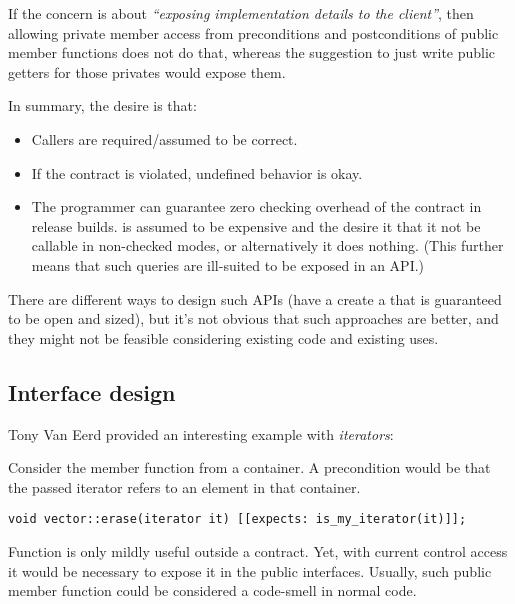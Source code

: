 If the concern is about \emph{``exposing implementation details to the client''}, then
allowing private member access from preconditions and postconditions
of public member functions does not do that, whereas the suggestion to just
write public getters for those privates would expose them.

In summary, the desire is that:

\begin{itemize}

\item Callers are required/assumed to be correct.

\item If the contract is violated, undefined behavior is okay.

\item The programmer can guarantee zero checking overhead of the contract in
release builds.  is assumed to be expensive and the
desire it that it not be callable in non-checked modes, or alternatively it
does nothing. (This further means that such queries are ill-suited to be
exposed in an API.) 

\end{itemize}

There are different ways to design such APIs (have a  create a
 that is guaranteed to be open and sized), but it’s not
obvious that such approaches are better, and they might not be feasible
considering existing code and existing uses.

\subsection{Interface design}

Tony Van Eerd provided an interesting example with \emph{iterators}:

Consider the  member function from a container. A precondition
would be that the passed iterator refers to an element in that container.

\begin{lstlisting}
void vector::erase(iterator it) [[expects: is_my_iterator(it)]];
\end{lstlisting}

Function  is only mildly useful outside a contract.
Yet, with current control access it would be necessary to expose it in the
public interfaces. Usually, such public member function could be considered a
code-smell in normal code.


